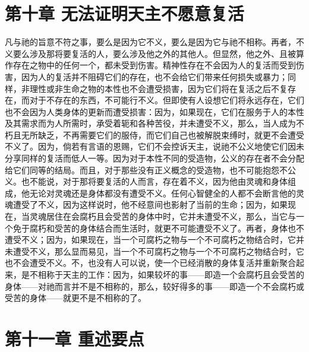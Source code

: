 \section{第十章 无法证明天主不愿意复活}

凡与祂的旨意不符之事，要么是因为它不义，要么是因为它与祂不相称。再者，不义要么涉及那将要复活的人，要么涉及他之外的其他人。但显然，他之外、且被算作存在之物中的任何一个，都未受到伤害。精神性存在不会因为人的复活而受到伤害，因为人的复活并不阻碍它们的存在，也不会给它们带来任何损失或暴力；同样，非理性或非生命之物的本性也不会遭受损害，因为它们将在复活之后不复存在，而对于不存在的东西，不可能行不义。但即使有人设想它们将永远存在，它们也不会因为人类身体的更新而遭受损害：因为，如果现在，它们在服务于人的本性及其需求而为人所需时，承受着轭和各种苦役，并未遭受不义，那么，当人成为不朽且无所缺乏，不再需要它们的服侍，而它们自己也被解脱束缚时，就更不会遭受不义了。因为，倘若有言语的恩赐，它们不会控诉天主，说祂不公义地使它们因未分享同样的复活而低人一等。因为对于本性不同的受造物，公义的存在者不会分配给它们同等的结局。而且，对于那些没有正义概念的受造物，也不可能抱怨不公义。也不能说，对于那将要复活的人而言，存在着不义，因为他由灵魂和身体组成，他无论对灵魂还是身体都没有遭受不义。任何心智健全的人都不会断言他的灵魂遭受了不义，因为这样说时，他不经意间也影射了当前的生命；因为，如果现在，当灵魂居住在会腐朽且会受苦的身体中时，它并未遭受不义，那么，当它与一个免于腐朽和受苦的身体结合而生活时，就更不可能遭受不义了。再者，身体也不遭受不义；因为，如果现在，当一个可腐朽之物与一个不可腐朽之物结合时，它并未遭受不义，那么显而易见，当一个不可腐朽之物与一个不可腐朽之物结合时，它也不会遭受不义。不，也没有人可以说，使一个已经消散的身体复活并重新聚合起来，是不相称于天主的工作：因为，如果较坏的事——即造一个会腐朽且会受苦的身体——对祂而言并不是不相称的，那么，较好得多的事——即造一个不会腐朽或受苦的身体——就更不是不相称的了。\par


\section{第十一章 重述要点}

